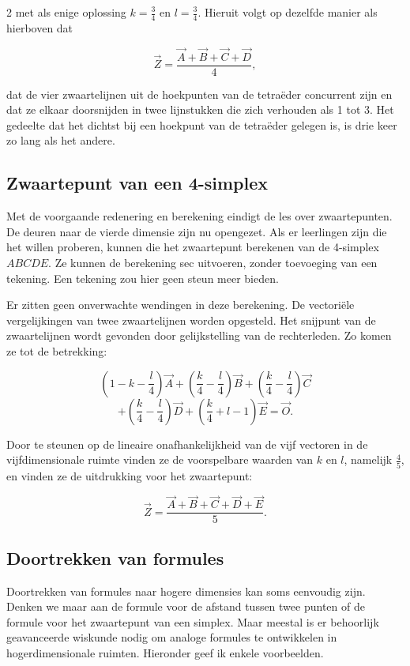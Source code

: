 \begin{multicols}{2}
met als enige oplossing $k=\frac{3}{4}$	en  $l=\frac{3}{4}$. Hieruit volgt op dezelfde manier als hierboven dat

\[\vec{Z}=\frac{\vec{A}+\vec{B}+\vec{C}+\vec{D}}{4},\]

dat de vier zwaartelijnen uit de hoekpunten van de tetraëder concurrent zijn en dat ze elkaar doorsnijden in twee lijnstukken die zich verhouden als 1 tot 3. Het gedeelte dat het dichtst bij een hoekpunt van de tetraëder gelegen is, is drie keer zo lang als het andere.

\subsection{Zwaartepunt van een 4-simplex}

Met de voorgaande redenering en berekening eindigt de les over zwaartepunten. De deuren naar de vierde dimensie zijn nu opengezet. Als er leerlingen zijn die het willen proberen, kunnen die het zwaartepunt berekenen van de 4-simplex $ABCDE$. Ze kunnen de berekening sec uitvoeren, zonder toevoeging van een tekening. Een tekening zou hier geen steun meer bieden. 

Er zitten geen onverwachte wendingen in deze berekening. De vectoriële vergelijkingen van twee zwaartelijnen worden opgesteld. Het snijpunt van de zwaartelijnen wordt gevonden door gelijkstelling van de rechterleden. Zo komen ze tot de betrekking:

\[ \left( 1-k-\frac{l}{4} \right) \vec{A}+\left(\frac{k}{4}-\frac{l}{4}\right) \vec{B}+\left(\frac{k}{4}-\frac{l}{4}\right) \vec{C}\]
 \[+\left(\frac{k}{4}-\frac{l}{4}\right) \vec{D}+\left(\frac{k}{4}+l-1 \right) \vec{E}=\vec{O}.\]
 
Door te steunen op de lineaire onafhankelijkheid van de vijf vectoren in de vijfdimensionale ruimte vinden ze de voorspelbare waarden van $k$ en $l$, namelijk $\frac{4}{5}$, en vinden ze de uitdrukking voor het zwaartepunt:

\[\vec{Z}=\frac{\vec{A}+\vec{B}+\vec{C}+\vec{D}+\vec{E}}{5}.\]

\subsection{Doortrekken van formules}

Doortrekken van formules naar hogere dimensies kan soms eenvoudig zijn. Denken we maar aan de formule voor de afstand tussen twee punten of de formule voor het zwaartepunt van een simplex. Maar meestal is er behoorlijk geavanceerde wiskunde nodig om analoge formules te ontwikkelen in hogerdimensionale ruimten. Hieronder geef ik enkele voorbeelden.


\end{multicols}
